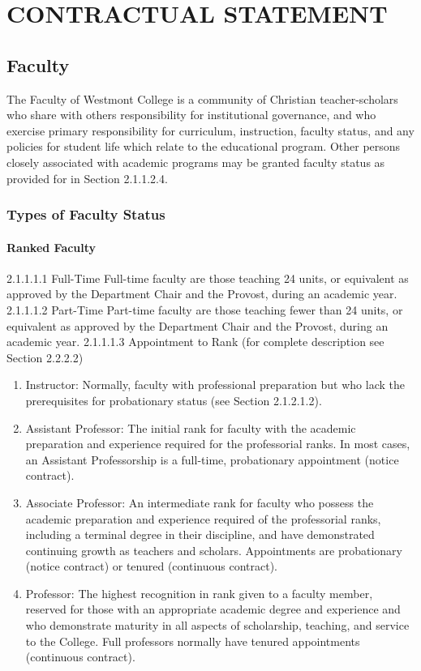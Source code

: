 \documentclass[letterpaper, 11pt]{article}
\begin{document}
\section{CONTRACTUAL STATEMENT}
	\label{sec:ContractualStatement}
	\subsection{Faculty}
		The Faculty of Westmont College is a community of Christian teacher-scholars who share with others responsibility for institutional governance, and who exercise primary responsibility for curriculum, instruction, faculty status, and any policies for student life which relate to the educational program.  Other persons closely associated with academic programs may be granted faculty status as provided for in Section 2.1.1.2.4.
		\subsubsection{Types of Faculty Status}
			\paragraph{Ranked Faculty}
				2.1.1.1.1 Full-Time
				Full-time faculty are those teaching 24 units, or equivalent as approved by the Department Chair and the Provost, during an academic year.
				2.1.1.1.2 Part-Time
				Part-time faculty are those teaching fewer than 24 units, or equivalent as approved by the Department Chair and the Provost, during an academic year.
				2.1.1.1.3 Appointment to Rank
				(for complete description see Section 2.2.2.2)
				\begin{enumerate}[label=\alph*)]
					\item{Instructor:  Normally, faculty with professional preparation but who lack the prerequisites for probationary status (see Section 2.1.2.1.2).}
					\item{Assistant Professor:  The initial rank for faculty with the academic preparation and experience required for the professorial ranks. In most cases, an Assistant Professorship is a full-time, probationary appointment (notice contract).}
					\item{Associate Professor:  An intermediate rank for faculty who possess the academic preparation and experience required of the professorial ranks, including a terminal degree in their discipline, and have demonstrated continuing growth as teachers and scholars. Appointments are probationary (notice contract) or tenured (continuous contract).}
					\item{Professor:  The highest recognition in rank given to a faculty member, reserved for those with an appropriate academic degree and experience and who demonstrate maturity in all aspects of scholarship, teaching, and service to the College. Full professors normally have tenured appointments (continuous contract).}
				\end{enumerate}
\end{document}
